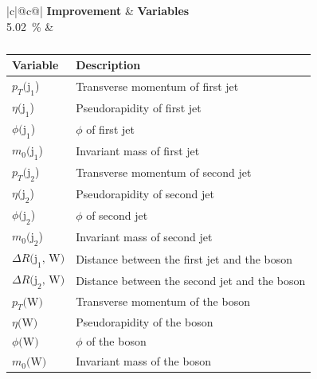\begin{table}[h]
    \centering
    \label{tab:app_vars_2}
    \caption{}
    \begin{tabular}{ |c|@{}c@{}| }
        \hline
        \textbf{Improvement} & \textbf{Variables}\\
        \hline
        \SI{5.02}{\%} & 
        \begin{tabular}{ll}
            \hline
            Variable & Description\\
            \hline
            $p_T\text{(j}_\text{1}$) & Transverse momentum of first jet\\
            $\eta\text{(j}_\text{1}$) & Pseudorapidity of first jet\\
            $\phi\text{(j}_\text{1}$) & $\phi$ of first jet\\
            $m_0\text{(j}_\text{1}$) & Invariant mass of first jet\\

            $p_T\text{(j}_\text{2}$) & Transverse momentum of second jet\\
            $\eta\text{(j}_\text{2}$) & Pseudorapidity of second jet\\
            $\phi\text{(j}_\text{2}$) & $\phi$ of second jet\\
            $m_0\text{(j}_\text{2}$) & Invariant mass of second jet\\

            $\Delta R \text{(j}_\text{1}\text{, W)}$ & Distance between the first jet and the \PWplus boson\\
            $\Delta R \text{(j}_\text{2}\text{, W)}$ & Distance between the second jet and the \PWplus boson\\

            $p_T\text{(W)}$ & Transverse momentum of the \PWplus boson\\
            $\eta\text{(W)}$ & Pseudorapidity of the \PWplus boson\\
            $\phi\text{(W)}$ & $\phi$ of the \PWplus boson\\
            $m_0\text{(W)}$ & Invariant mass of the \PWplus boson\\
            \hline
        \end{tabular}\\
        \hline
    \end{tabular}
\end{table}

